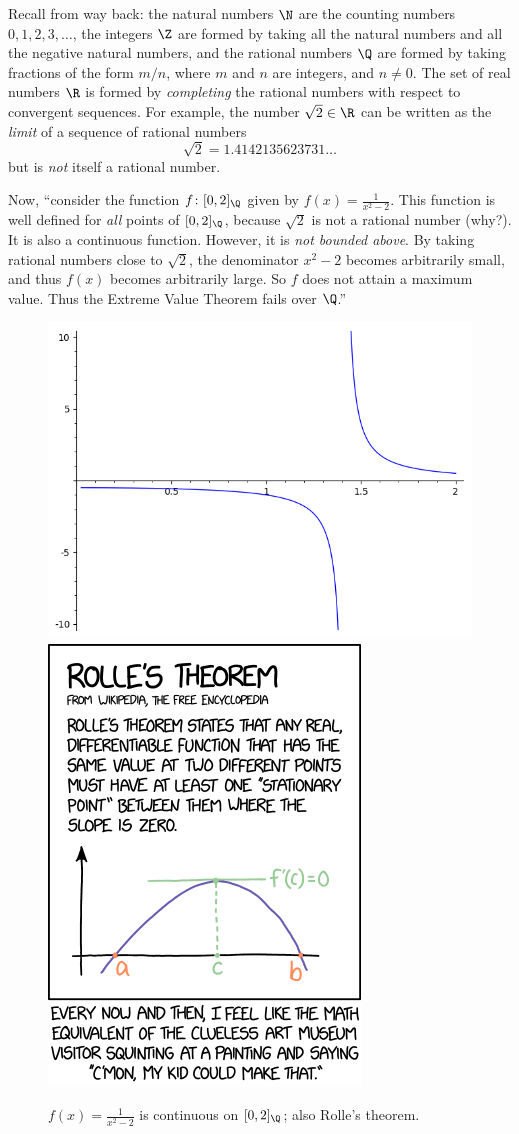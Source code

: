 \documentclass{ccg-topic}
\begin{document}
\begin{ex}
    \label{ex:the_extreme_value_theorem_fails_over_q_}
    Recall from way back: the natural numbers $\N$ are the counting numbers $0, 1, 2, 3, \ldots$, the integers $\Z$ are formed by taking all the natural numbers and all the negative natural numbers, and the rational numbers $\Q$ are formed by taking fractions of the form $m/n$, where $m$ and $n$ are integers, and $n \neq 0$. The set of real numbers $\R$ is formed by \emph{completing} the rational numbers with respect to convergent sequences. For example, the number $\sqrt{2} \in \R$ can be written as the \emph{limit} of a sequence of rational numbers 
    \[\sqrt{2} = 1.4142135623731\ldots\] 
    but is \emph{not} itself a rational number.

    Now, ``consider the function $f \colon [0, 2]_{\Q}$ given by $f(x) = \frac{1}{x^2 - 2}$. This function is well defined for \emph{all} points of $[0,2]_{\Q}$, because $\sqrt{2}$ is not a rational number (why?). It is also a continuous function. However, it is \emph{not bounded above}. By taking rational numbers close to $\sqrt{2}$, the denominator $x^2 - 2$ becomes arbitrarily small, and thus $f(x)$ becomes arbitrarily large. So $f$ does not attain a maximum value. Thus the Extreme Value Theorem fails over $\Q$.''
    \begin{figure}[htpb]
        \centering
        \includegraphics[width=0.6\linewidth]{images/2019-05-05-poles.png}
        \includegraphics[width=0.3\linewidth]{images/2019-05-05-rolles.png}
        \caption{$f(x) = \frac{1}{x^2 - 2}$ is continuous on $[0,2]_\Q$; also Rolle's theorem.}
        \label{fig:images/2019-05-05-poles}
    \end{figure}
\end{ex}
\end{document}
